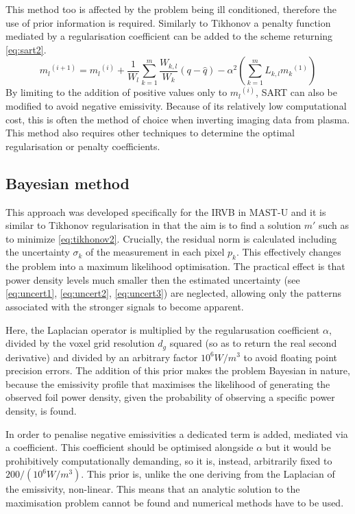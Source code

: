 This method too is affected by the problem being ill conditioned, therefore the use of prior information is required. Similarly to Tikhonov a penalty function mediated by a regularisation coefficient can be added to the scheme returning \autoref{eq:sart2}.
\begin{equation}
{m_{l}}^{(i+1)} = {m_{l}}^{(i)} + \frac{1}{W_{l}} {\sum_{k=1}^{m} \frac{W_{k,l}}{W_{k}}(q-\hat{q})} - \alpha^2({\sum_{k=1}^{m} L_{k,l} {m_{k}}^{(1)}})
\label{eq:sart2}
\end{equation}
By limiting to the addition of positive values only to ${m_{l}}^{(i)}$, SART can also be modified to avoid negative emissivity.\cite{Carr2018} %
Because of its relatively low computational cost, this is often the method of choice when inverting imaging data from plasma. This method also requires other techniques to determine the optimal regularisation or penalty coefficients.

\subsection{Bayesian method}
This approach was developed specifically for the IRVB in MAST-U and it is similar to Tikhonov regularisation in that the aim is to find a solution $m'$ such as to minimize \autoref{eq:tikhonov2}. Crucially, the residual norm is calculated including the uncertainty $\sigma_k$ of the measurement in each pixel $p_k$. This effectively changes the problem into a maximum likelihood optimisation. The practical effect is that power density levels much smaller then the estimated uncertainty (see \autoref{eq:uncert1}, \ref{eq:uncert2}, \ref{eq:uncert3}) are neglected, allowing only the patterns associated with the stronger signals to become apparent. 

Here, the Laplacian operator is multiplied by the regularusation coefficient $\alpha$, divided by the voxel grid resolution $d_g$ squared (so as to return the real second derivative) and divided by an arbitrary factor $10^6W/m^3$ to avoid floating point precision errors. The addition of this prior makes the problem Bayesian in nature, because the emissivity profile that maximises the likelihood of generating the observed foil power density, given the probability of observing a specific power density, is found.

In order to penalise negative emissivities a dedicated term is added, mediated via a coefficient. This coefficient should be optimised alongside $\alpha$ but it would be prohibitively computationally demanding, so it is, instead, arbitrarily fixed to $200/(10^6W/m^3)$. This prior is, unlike the one deriving from the Laplacian of the emissivity, non-linear. This means that an analytic solution to the maximisation problem cannot be found and numerical methods have to be used. 

